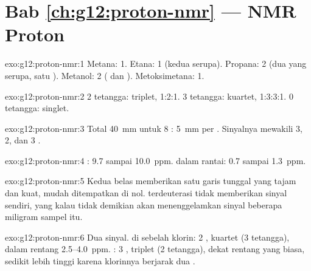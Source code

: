 \section*{Bab \ref{ch:g12:proton-nmr} --- NMR Proton}

\begin{solution}{exo:g12:proton-nmr:1}
Metana: 1. Etana: 1 (kedua  serupa). Propana: 2 (dua 
yang serupa, satu ). Metanol: 2 ( dan ).
Metoksimetana: 1.
\end{solution}

\begin{solution}{exo:g12:proton-nmr:2}
2 tetangga: triplet, 1:2:1. 3 tetangga: kuartet, 1:3:3:1. 0 tetangga:
singlet.
\end{solution}

\begin{solution}{exo:g12:proton-nmr:3}
Total \qty{40}{mm} untuk 8 : \qty{5}{mm} per . Sinyalnya
mewakili 3, 2, dan 3 .
\end{solution}

\begin{solution}{exo:g12:proton-nmr:4}
: 9.7 sampai \qty{10.0}{ppm}.  dalam rantai: 0.7 sampai
\qty{1.3}{ppm}.
\end{solution}

\begin{solution}{exo:g12:proton-nmr:5}
Kedua belas  memberikan satu garis tunggal yang
tajam dan kuat, mudah ditempatkan di nol.  terdeuterasi tidak
memberikan sinyal  sendiri, yang kalau tidak demikian akan
menenggelamkan sinyal beberapa miligram sampel itu.
\end{solution}

\begin{solution}{exo:g12:proton-nmr:6}
Dua sinyal.  di sebelah klorin: 2 , kuartet (3 tetangga),
dalam rentang 2.5--\qty{4.0}{ppm}. : 3 , triplet (2
tetangga), dekat rentang  yang biasa, sedikit lebih tinggi
karena klorinnya berjarak dua .
\end{solution}

